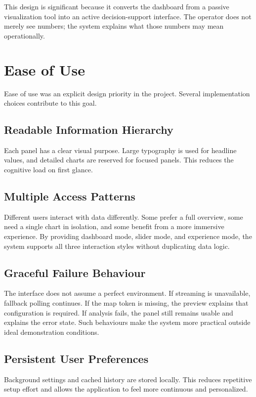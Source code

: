 \documentclass[conference]{IEEEtran}
\begin{document}
This design is significant because it converts the dashboard from a passive visualization tool into an active decision-support interface. The operator does not merely see numbers; the system explains what those numbers may mean operationally.

\section{Ease of Use}
Ease of use was an explicit design priority in the project. Several implementation choices contribute to this goal.

\subsection{Readable Information Hierarchy}
Each panel has a clear visual purpose. Large typography is used for headline values, and detailed charts are reserved for focused panels. This reduces the cognitive load on first glance.

\subsection{Multiple Access Patterns}
Different users interact with data differently. Some prefer a full overview, some need a single chart in isolation, and some benefit from a more immersive experience. By providing dashboard mode, slider mode, and experience mode, the system supports all three interaction styles without duplicating data logic.

\subsection{Graceful Failure Behaviour}
The interface does not assume a perfect environment. If streaming is unavailable, fallback polling continues. If the map token is missing, the preview explains that configuration is required. If analysis fails, the panel still remains usable and explains the error state. Such behaviours make the system more practical outside ideal demonstration conditions.

\subsection{Persistent User Preferences}
Background settings and cached history are stored locally. This reduces repetitive setup effort and allows the application to feel more continuous and personalized.
\end{document}
